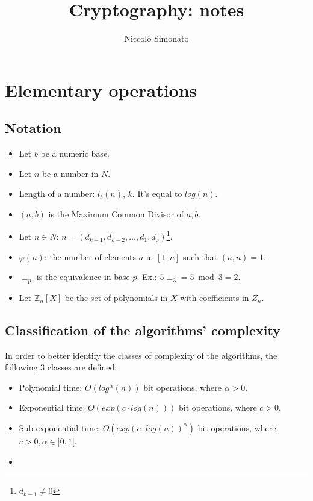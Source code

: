 \documentclass[12pt, a4paper, english]{report}
\author{Niccolò Simonato}
\title{Cryptography: notes}
\begin{document}
\maketitle

\tableofcontents

\chapter{Elementary operations}
\section{Notation}
\begin{itemize}
    \item Let $b$ be a numeric base.
    \item Let $n$ be a number in $N$.
    \item Length of a number: $l_{b}(n)$, $k$. It's equal to $log(n)$.
    \item $(a,b)$ is the Maximum Common Divisor of $a,b$.
    \item Let $n \in N$: $n = (d_{k-1}, d_{k-2}, \dots, d_{1}, d_{0})$\footnote{$d_{k-1} \neq 0$}.
    \item $\varphi(n)$: the number of elements $a$ in $[1,n]$ such that $(a,n) = 1$.
    \item $\equiv_{p}$ is the equivalence in base $p$. Ex.: $5 \equiv_{3} = 5 \bmod 3 = 2 $.
    \item Let $\mathbb{Z}_{n}[X]$ be the set of polynomials in $X$ with coefficients in $Z_{n}$.
\end{itemize}


\section{Classification of the algorithms' complexity}
In order to better identify the classes of complexity of the algorithms, the following 3 classes are defined:
\begin{itemize}
    \item Polynomial time: $O(log^{\alpha}(n))$ bit operations, where $\alpha > 0$.
    \item Exponential time: $O(exp(c \cdot log(n)))$ bit operations, where $c > 0$.
    \item Sub-exponential time: $O(exp(c \cdot log(n))^{\alpha})$ bit operations, where $c > 0, \alpha \in ]0, 1[$.
\item
\end{itemize}
\end{document}
